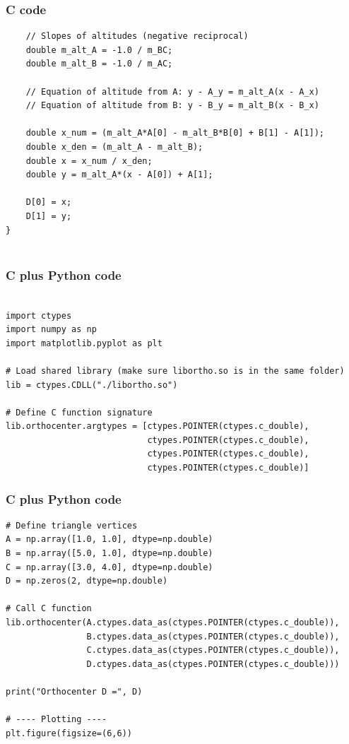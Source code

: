 \documentclass{beamer}
\begin{document}
\begin{frame}[fragile]
    \frametitle{C code}
    \begin{lstlisting}
    // Slopes of altitudes (negative reciprocal)
    double m_alt_A = -1.0 / m_BC;
    double m_alt_B = -1.0 / m_AC;

    // Equation of altitude from A: y - A_y = m_alt_A(x - A_x)
    // Equation of altitude from B: y - B_y = m_alt_B(x - B_x)

    double x_num = (m_alt_A*A[0] - m_alt_B*B[0] + B[1] - A[1]);
    double x_den = (m_alt_A - m_alt_B);
    double x = x_num / x_den;
    double y = m_alt_A*(x - A[0]) + A[1];

    D[0] = x;
    D[1] = y;
}


\end{lstlisting}
 
\end{frame}
\begin{frame}[fragile]
    \frametitle{C plus Python code}
    \begin{lstlisting}

import ctypes
import numpy as np
import matplotlib.pyplot as plt

# Load shared library (make sure libortho.so is in the same folder)
lib = ctypes.CDLL("./libortho.so")

# Define C function signature
lib.orthocenter.argtypes = [ctypes.POINTER(ctypes.c_double),
                            ctypes.POINTER(ctypes.c_double),
                            ctypes.POINTER(ctypes.c_double),
                            ctypes.POINTER(ctypes.c_double)]
\end{lstlisting}
 
\end{frame}
\begin{frame}[fragile]
    \frametitle{C plus Python code}
    \begin{lstlisting}
# Define triangle vertices
A = np.array([1.0, 1.0], dtype=np.double)
B = np.array([5.0, 1.0], dtype=np.double)
C = np.array([3.0, 4.0], dtype=np.double)
D = np.zeros(2, dtype=np.double)

# Call C function
lib.orthocenter(A.ctypes.data_as(ctypes.POINTER(ctypes.c_double)),
                B.ctypes.data_as(ctypes.POINTER(ctypes.c_double)),
                C.ctypes.data_as(ctypes.POINTER(ctypes.c_double)),
                D.ctypes.data_as(ctypes.POINTER(ctypes.c_double)))

print("Orthocenter D =", D)

# ---- Plotting ----
plt.figure(figsize=(6,6))
\end{lstlisting}
 
\end{frame}
\end{document}
